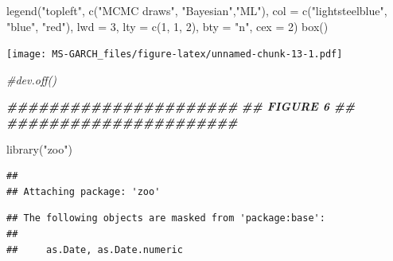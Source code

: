 \documentclass[
]{article}
\newenvironment{Shaded}{\begin{snugshade}}{\end{snugshade}}
\newcommand{\AttributeTok}[1]{\textcolor[rgb]{0.77,0.63,0.00}{#1}}
\newcommand{\CommentTok}[1]{\textcolor[rgb]{0.56,0.35,0.01}{\textit{#1}}}
\newcommand{\DecValTok}[1]{\textcolor[rgb]{0.00,0.00,0.81}{#1}}
\newcommand{\DocumentationTok}[1]{\textcolor[rgb]{0.56,0.35,0.01}{\textbf{\textit{#1}}}}
\newcommand{\FunctionTok}[1]{\textcolor[rgb]{0.00,0.00,0.00}{#1}}
\newcommand{\NormalTok}[1]{#1}
\newcommand{\StringTok}[1]{\textcolor[rgb]{0.31,0.60,0.02}{#1}}
\begin{document}
\begin{Shaded}
\begin{Highlighting}[]
\FunctionTok{legend}\NormalTok{(}\StringTok{"topleft"}\NormalTok{, }\FunctionTok{c}\NormalTok{(}\StringTok{"MCMC draws"}\NormalTok{, }\StringTok{"Bayesian"}\NormalTok{,}\StringTok{"ML"}\NormalTok{),}
       \AttributeTok{col =} \FunctionTok{c}\NormalTok{(}\StringTok{"lightsteelblue"}\NormalTok{, }\StringTok{"blue"}\NormalTok{, }\StringTok{"red"}\NormalTok{), }\AttributeTok{lwd =} \DecValTok{3}\NormalTok{,}
       \AttributeTok{lty =} \FunctionTok{c}\NormalTok{(}\DecValTok{1}\NormalTok{, }\DecValTok{1}\NormalTok{, }\DecValTok{2}\NormalTok{), }\AttributeTok{bty =} \StringTok{"n"}\NormalTok{, }\AttributeTok{cex =} \DecValTok{2}\NormalTok{)}
\FunctionTok{box}\NormalTok{()}
\end{Highlighting}
\end{Shaded}

\texttt{[image: MS-GARCH\_files/figure-latex/unnamed-chunk-13-1.pdf]}

\begin{Shaded}
\begin{Highlighting}[]
\CommentTok{\#dev.off()}
\end{Highlighting}
\end{Shaded}

\begin{Shaded}
\begin{Highlighting}[]
\DocumentationTok{\#\#\#\#\#\#\#\#\#\#\#\#\#\#\#\#\#\#\#\#\#\#}
\DocumentationTok{\#\#     FIGURE 6     \#\#}
\DocumentationTok{\#\#\#\#\#\#\#\#\#\#\#\#\#\#\#\#\#\#\#\#\#\#}

\FunctionTok{library}\NormalTok{(}\StringTok{"zoo"}\NormalTok{)}
\end{Highlighting}
\end{Shaded}

\begin{verbatim}
## 
## Attaching package: 'zoo'
\end{verbatim}

\begin{verbatim}
## The following objects are masked from 'package:base':
## 
##     as.Date, as.Date.numeric
\end{verbatim}
\end{document}
